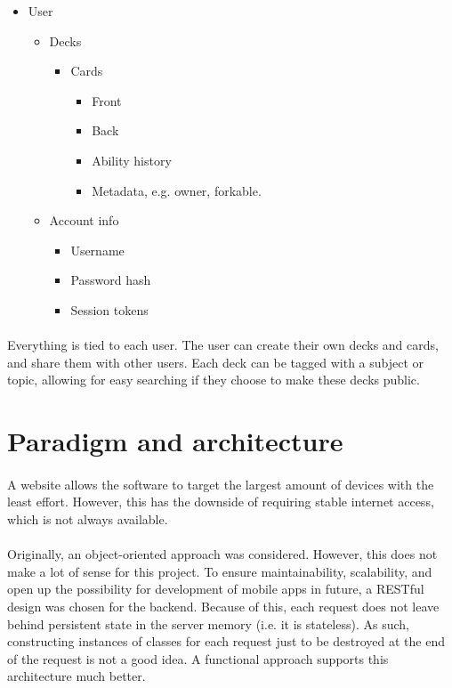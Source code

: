 \documentclass{report}
\begin{document}
\begin{itemize}
  \item User \begin{itemize}
    \item Decks \begin{itemize}
      \item Cards \begin{itemize}
        \item Front
        \item Back
        \item Ability history
        \item Metadata, e.g. owner, forkable.
      \end{itemize}
    \end{itemize}
    \item Account info \begin{itemize}
      \item Username
      \item Password hash
      \item Session tokens
    \end{itemize}
  \end{itemize}
\end{itemize}

\paragraph{}
Everything is tied to each user. The user can create their own decks and cards, and share them with other users. Each deck can be tagged with a subject or topic, allowing for easy searching if they choose to make these decks public.

\section{Paradigm and architecture}
\paragraph{}
A website allows the software to target the largest amount of devices with the least effort. However, this has the downside of requiring stable internet access, which is not always available.

\paragraph{}
Originally, an object-oriented approach was considered. However, this does not make a lot of sense for this project. To ensure maintainability, scalability, and open up the possibility for development of mobile apps in future, a RESTful design was chosen for the backend. Because of this, each request does not leave behind persistent state in the server memory (i.e. it is stateless). As such, constructing instances of classes for each request just to be destroyed at the end of the request is not a good idea. A functional approach supports this architecture much better.
\end{document}

